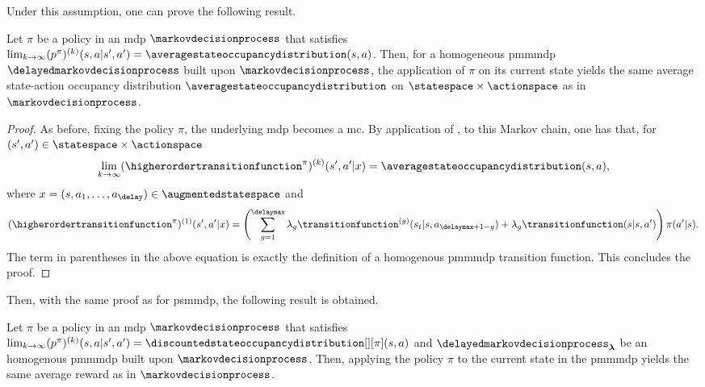 Under this assumption, one can prove the following result.
\begin{lemma}
\label{lem:same_distrib_pmmmdp}
    Let $\pi$ be a policy in an \gls{mdp} $\markovdecisionprocess$ that satisfies $\textstyle\lim_{k\rightarrow\infty}(p^\pi)^{(k)}(s,a\vert s',a')= \averagestateoccupancydistribution(s,a)$.
    Then, for a homogeneous \gls{pmmmdp} $\delayedmarkovdecisionprocess$ built upon $\markovdecisionprocess$, the application of $\pi$ on its current state yields the same average state-action occupancy distribution $\averagestateoccupancydistribution$ on $\statespace\times\actionspace$ as in $\markovdecisionprocess$.
\end{lemma}
\begin{proof}
    As before, fixing the policy $\pi$, the underlying \gls{mdp} becomes a \gls{mc}. 
    By application of \cite[Proposition~4]{berchtold1996modelisation}, to this Markov chain, one has that, for $(s',a')\in\statespace\times\actionspace$
    \begin{align*}
        \lim_{k\rightarrow\infty}(\higherordertransitionfunction^\pi)^{(k)}(s',a' \vert x) = \averagestateoccupancydistribution(s,a),
    \end{align*}
    where $x=(s,a_1,\dots,a_\delay)\in\augmentedstatespace$ and
    \begin{align*}
        (\higherordertransitionfunction^\pi)^{(1)}(s',a' \vert x)= \left(\sum_{g=1}^{\delaymax} \lambda_g \transitionfunction^{(g)}(s_t\vert s,a_{\delaymax+1-g}) + \lambda_g \transitionfunction(s\vert s,a')\right)\pi(a'\vert s).
    \end{align*} 
    The term in parentheses in the above equation is exactly the definition of a homogenous \gls{pmmmdp} transition function.
    This concludes the proof.
\end{proof}
Then, with the same proof as for \gls{psmmdp}, the following result is obtained.
\begin{thm}
\label{th:pmmmdp_same}
    Let $\pi$ be a policy in an \gls{mdp} $\markovdecisionprocess$ that satisfies $\lim_{k\rightarrow\infty}(p^\pi)^{(k)}(s,a\vert s',a')= \discountedstateoccupancydistribution[][\pi](s,a)$ and $\delayedmarkovdecisionprocess_{\boldsymbol{\lambda}}$ be an homogenous \gls{pmmmdp} built upon $\markovdecisionprocess$. 
    Then, applying the policy $\pi$ to the current state in the \gls{pmmmdp} yields the same average reward as in $\markovdecisionprocess$.
\end{thm}


